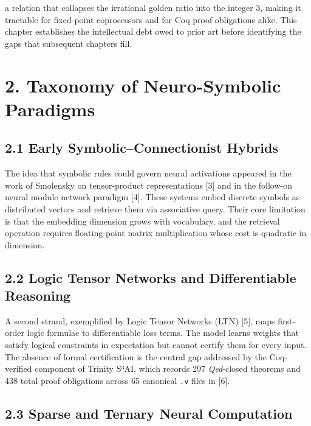 a relation that collapses the irrational golden
ratio into the integer 3, making it tractable for
fixed-point coprocessors and for Coq proof
obligations alike. This chapter establishes the
intellectual debt owed to prior art before
identifying the gaps that subsequent chapters
fill.

\section{2. Taxonomy of Neuro-Symbolic
Paradigms}\label{fa_02:taxonomy-of-neuro-symbolic-paradigms}

\subsection{2.1 Early Symbolic--Connectionist
Hybrids}\label{fa_02:early-symbolicconnectionist-hybrids}

The idea that symbolic rules could govern neural
activations appeared in the work of Smolensky on
tensor-product representations [3] and in the
follow-on neural module network paradigm [4].
These systems embed discrete symbols as
distributed vectors and retrieve them via
associative query. Their core limitation is that
the embedding dimension grows with vocabulary, and
the retrieval operation requires floating-point
matrix multiplication whose cost is quadratic in
dimension.

\subsection{2.2 Logic Tensor Networks and
Differentiable
Reasoning}\label{fa_02:logic-tensor-networks-and-differentiable-reasoning}

A second strand, exemplified by Logic Tensor
Networks (LTN) [5], maps first-order logic
formulae to differentiable loss terms. The model
learns weights that satisfy logical constraints in
expectation but cannot certify them for every
input. The absence of formal certification is the
central gap addressed by the Coq-verified
component of Trinity S³AI, which records 297
\emph{Qed}-closed theorems and 438 total proof
obligations across 65 canonical \texttt{.v} files
in  [6].

\subsection{2.3 Sparse and Ternary Neural
Computation}\label{fa_02:sparse-and-ternary-neural-computation}

